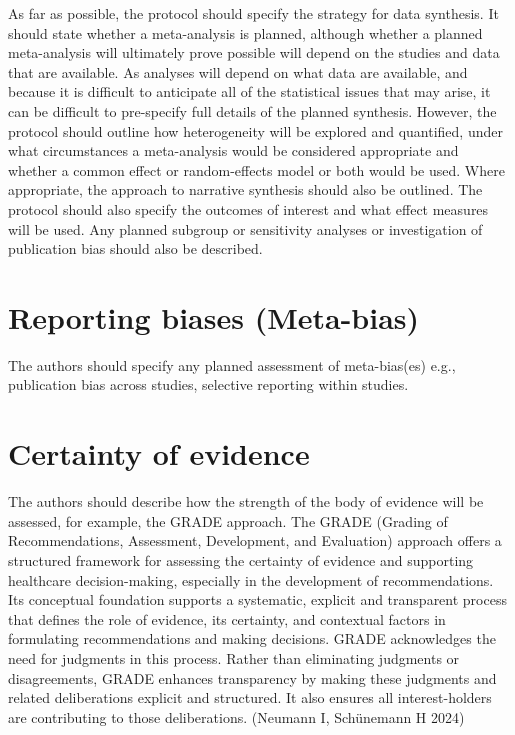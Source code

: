 \documentclass[
  11pt,
  a4paper,
  DIV=11,
  numbers=noendperiod]{scrreprt}
\begin{document}
As far as possible, the protocol should specify the strategy for data
synthesis. It should state whether a meta-analysis is planned, although
whether a planned meta-analysis will ultimately prove possible will
depend on the studies and data that are available. As analyses will
depend on what data are available, and because it is difficult to
anticipate all of the statistical issues that may arise, it can be
difficult to pre-specify full details of the planned synthesis. However,
the protocol should outline how heterogeneity will be explored and
quantified, under what circumstances a meta-analysis would be considered
appropriate and whether a common effect or random-effects model or both
would be used. Where appropriate, the approach to narrative synthesis
should also be outlined. The protocol should also specify the outcomes
of interest and what effect measures will be used. Any planned subgroup
or sensitivity analyses or investigation of publication bias should also
be described.

\section{Reporting biases (Meta-bias)}\label{reporting-biases-meta-bias}

The authors should specify any planned assessment of meta-bias(es) e.g.,
publication bias across studies, selective reporting within studies.

\section{Certainty of evidence}\label{certainty-of-evidence}

The authors should describe how the strength of the body of evidence
will be assessed, for example, the GRADE approach. The GRADE (Grading of
Recommendations, Assessment, Development, and Evaluation) approach
offers a structured framework for assessing the certainty of evidence
and supporting healthcare decision-making, especially in the development
of recommendations. Its conceptual foundation supports a systematic,
explicit and transparent process that defines the role of evidence, its
certainty, and contextual factors in formulating recommendations and
making decisions. GRADE acknowledges the need for judgments in this
process. Rather than eliminating judgments or disagreements, GRADE
enhances transparency by making these judgments and related
deliberations explicit and structured. It also ensures all
interest-holders are contributing to those deliberations. (Neumann I,
Schünemann H 2024)
\end{document}
